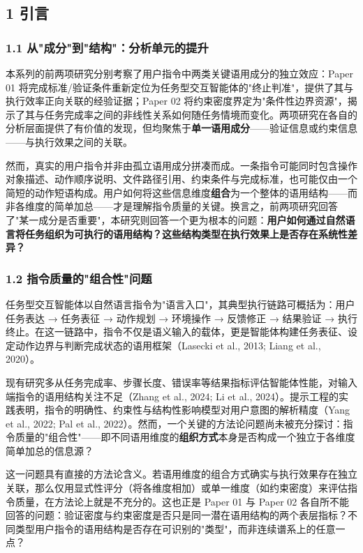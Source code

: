 \documentclass[12pt,a4paper,openany,oneside]{ctexrep}
\begin{document}
\subsection{1 引言}


\subsubsection{1.1 从"成分"到"结构"：分析单元的提升}


本系列的前两项研究分别考察了用户指令中两类关键语用成分的独立效应：Paper 01 将完成标准/验证条件重新定位为任务型交互智能体的"终止判准"，提供了其与执行效率正向关联的经验证据；Paper 02 将约束密度界定为"条件性边界资源"，揭示了其与任务完成率之间的非线性关系如何随任务情境而变化。两项研究在各自的分析层面提供了有价值的发现，但均聚焦于\textbf{单一语用成分}——验证信息或约束信息——与执行效果之间的关联。

然而，真实的用户指令并非由孤立语用成分拼凑而成。一条指令可能同时包含操作对象描述、动作顺序说明、文件路径引用、约束条件与完成标准，也可能仅由一个简短的动作短语构成。用户如何将这些信息维度\textbf{组合}为一个整体的语用结构——而非各维度的简单加总——才是理解指令质量的关键。换言之，前两项研究回答了"某一成分是否重要"，本研究则回答一个更为根本的问题：\textbf{用户如何通过自然语言将任务组织为可执行的语用结构？这些结构类型在执行效果上是否存在系统性差异？}

\subsubsection{1.2 指令质量的"组合性"问题}


任务型交互智能体以自然语言指令为"语言入口"，其典型执行链路可概括为：用户任务表达 → 任务表征 → 动作规划 → 环境操作 → 反馈修正 → 结果验证 → 执行终止。在这一链路中，指令不仅是语义输入的载体，更是智能体构建任务表征、设定动作边界与判断完成状态的语用框架（Lasecki et al., 2013; Liang et al., 2020）。

现有研究多从任务完成率、步骤长度、错误率等结果指标评估智能体性能，对输入端指令的语用结构关注不足（Zhang et al., 2024; Li et al., 2024）。提示工程的实践表明，指令的明确性、约束性与结构性影响模型对用户意图的解析精度（Yang et al., 2022; Pal et al., 2022）。然而，一个关键的方法论问题尚未被充分探讨：指令质量的"组合性"——即不同语用维度的\textbf{组织方式}本身是否构成一个独立于各维度简单加总的信息源？

这一问题具有直接的方法论含义。若语用维度的组合方式确实与执行效果存在独立关联，那么仅用显式性评分（将各维度相加）或单一维度（如约束密度）来评估指令质量，在方法论上就是不充分的。这也正是 Paper 01 与 Paper 02 各自所不能回答的问题：验证密度与约束密度是否只是同一潜在语用结构的两个表层指标？不同类型用户指令的语用结构是否存在可识别的"类型"，而非连续谱系上的任意一点？
\end{document}
